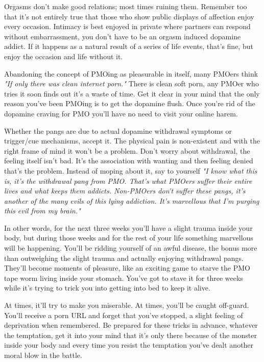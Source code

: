 \documentclass[easypeasy.tex]{subfiles}
\begin{document}
Orgasms don't make good relations; most times ruining them. Remember too that it's not entirely true that those who show public displays of affection enjoy every occasion. Intimacy is best enjoyed in private where partners can respond without embarrassment, you don't have to be an orgasm induced dopamine addict. If it happens as a natural result of a series of life events, that's fine, but enjoy the occasion and life without it.

Abandoning the concept of PMOing as pleasurable in itself, many PMOers think \textit{"If only there was clean internet porn."} There is clean soft porn, any PMOer who tries it soon finds out it's a waste of time. Get it clear in your mind that the only reason you've been PMOing is to get the dopamine flush. Once you're rid of the dopamine craving for PMO you'll have no need to visit your online harem.

Whether the pangs are due to actual dopamine withdrawal symptoms or trigger/cue mechanisms, accept it. The physical pain is non-existent and with the right frame of mind it won't be a problem. Don't worry about withdrawal, the feeling itself isn't bad. It's the association with wanting and then feeling denied that's the problem. Instead of moping about it, say to yourself \textit{"I know what this is, it's the withdrawal pang from PMO. That's what PMOers suffer their entire lives and what keeps them addicts. Non-PMOers don't suffer these pangs, it's another of the many evils of this lying addiction. It's marvellous that I'm purging this evil from my brain."}

In other words, for the next three weeks you'll have a slight trauma inside your body, but during those weeks and for the rest of your life something marvellous will be happening. You'll be ridding yourself of an awful disease, the bonus more than outweighing the slight trauma and actually enjoying withdrawal pangs. They'll become moments of pleasure, like an exciting game to starve the PMO tape worm living inside your stomach. You've got to stave it for three weeks while it's trying to trick you into getting into bed to keep it alive.

At times, it'll try to make you miserable. At times, you'll be caught off-guard. You'll receive a porn URL and forget that you've stopped, a slight feeling of deprivation when remembered. Be prepared for these tricks in advance, whatever the temptation, get it into your mind that it's only there because of the monster inside your body and every time you resist the temptation you've dealt another moral blow in the battle.
\end{document}
